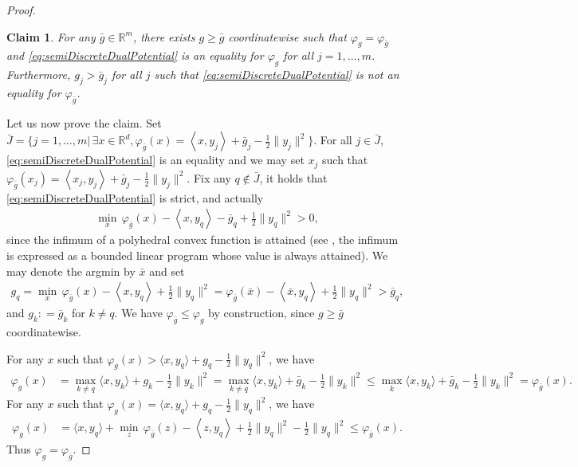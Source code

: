 \documentclass[11pt]{article}
\newtheorem{claim}[lemma]{Claim}
\newcommand{\R}{\mathbb R}
\newcommand{\1}{\mathbbm{1}}
\numberwithin{equation}{section}
\begin{document}
\begin{proof}
    \begin{claim} 
        For any $\bar{g} \in \R^m$, there exists $g \geq \bar{g}$ coordinatewise such that $\varphi_g = \varphi_{\bar{g}}$ and \eqref{eq:semiDiscreteDualPotential} is an equality for $\varphi_g$ for all $j = 1,\ldots,m$. Furthermore, $g_j > \bar{g}_j$ for all $j$ such that \eqref{eq:semiDiscreteDualPotential} is not an equality for $\varphi_{\bar{g}}$.
    \end{claim}

    Let us now prove the claim. Set $\bar{J} = \{j = 1,\ldots,m|\, \exists x \in \R^d, \varphi_{\bar{g}}(x) = \left\langle x, y_j\right\rangle + \bar{g}_j - \frac{1}{2} \|y_j\|^2\}$. For all $j \in \bar{J}$, \eqref{eq:semiDiscreteDualPotential} is an equality and we may set $x_j$ such that $\varphi_{\bar{g}}(x_j) = \left\langle x_j, y_j\right\rangle + \bar{g}_j - \frac{1}{2} \|y_j\|^2$. Fix any $q \not \in \bar{J}$, it holds that \eqref{eq:semiDiscreteDualPotential} is strict, and actually
    \begin{align*}
        \min_x\, \varphi_{\bar{g}}(x)- \left\langle x, y_q\right\rangle - \bar{g}_q + \frac{1}{2} \|y_q\|^2 > 0,
    \end{align*}
    since the infimum of a polyhedral convex function is attained (see \cite[Chapter 19]{rockafellar1970convex}, the infimum is expressed as a bounded linear program whose value is always attained). We may denote the argmin by $\bar{x}$ and set 
    \begin{align*}
        g_q = \min_x\, \varphi_{\bar{g}}(x)- \left\langle x, y_q\right\rangle  + \frac{1}{2} \|y_q\|^2 = \varphi_{\bar{g}}(\bar{x})- \left\langle \bar{x}, y_q\right\rangle  + \frac{1}{2} \|y_q\|^2 > \bar{g}_q,
    \end{align*}
    and $g_k \colon = \bar{g}_k$ for $k \neq q$. We have $\varphi_{\bar{g}} \leq \varphi_g$ by construction, since $g \geq \bar{g}$ coordinatewise.
    
    For any $x$ such that $\varphi_g(x) > \langle x,y_q \rangle+g_q-\frac{1}{2}\|y_q\|^2$, we have 
    \begin{align*}
        \varphi_g(x) &= \max_{k \neq q}\langle x,y_k \rangle+g_k-\frac{1}{2}\|y_k\|^2 
        = \max_{k \neq q}\langle x,y_k \rangle+\bar{g}_k-\frac{1}{2}\|y_k\|^2 
        \leq \max_{k}\langle x,y_k \rangle+\bar{g}_k-\frac{1}{2}\|y_k\|^2 = \varphi_{\bar{g}}(x).
    \end{align*}
    For any $x$ such that $\varphi_g(x) = \langle x,y_q \rangle+g_q-\frac{1}{2}\|y_q\|^2$, we have
    \begin{align*}
        \varphi_g(x) &=\langle x,y_q \rangle+\min_z\, \varphi_{\bar{g}}(z)- \left\langle z, y_q\right\rangle  + \frac{1}{2} \|y_q\|^2 -\frac{1}{2}\|y_q\|^2
        \leq \varphi_{\bar{g}}(x).
    \end{align*}
    Thus $\varphi_g = \varphi_{\bar{g}}$. 
    

\end{proof}
\end{document}
